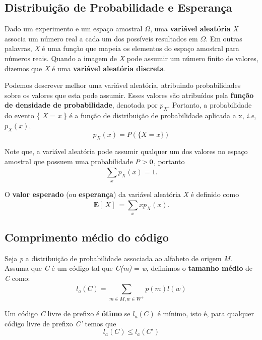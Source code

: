 \subsection{Distribuição de Probabilidade e Esperança}
Dado um experimento e um espaço amostral $\Omega$, uma \textbf{variável aleatória} \emph{X} associa um número real a cada um dos possíveis resultados em $\Omega$. Em outras palavras, \emph{X} é uma função que mapeia os elementos do espaço amostral para números reais. Quando a imagem de \emph{X} pode assumir um número finito de valores, dizemos que \emph{X} é uma \textbf{variável aleatória discreta}.

Podemos descrever melhor uma variável aleatória, atribuindo probabilidades sobre os valores que esta pode assumir. Esses valores são atribuídos pela \textbf{função de densidade de probabilidade}, denotada por \emph{$p_X$}. Portanto, a probabilidade do evento \{ \emph{X} = \emph{x} \} é a função de distribuição de probabilidade aplicada a x, \emph{i.e}, \emph{$p_X(x)$}.
\begin{equation} \label{eq:dist_prob_def}
p_X(x) = P(\{X = x\})
\end{equation}

Note que, a variável aleatória pode assumir qualquer um dos valores no espaço amostral que possuem uma probabilidade $\emph{P} > 0$, portanto
\begin{equation} \label{eq:dist_prob_sum}
\sum_{x}^{}p_X(x) = 1.
\end{equation}

O \textbf{valor esperado} (ou \textbf{esperança}) da variável aleatória \emph{X} é definido como
\begin{equation} \label{eq:exp_val}
\textbf{E}[\ X]\ = \sum_{x}^{} xp_X(x).
\end{equation}

\subsection{Comprimento médio do código}
Seja \emph{p} a distribuição de probabilidade associada ao alfabeto de origem \emph{M}. Assuma que \emph{C} é um código tal que \emph{C(m)} = \emph{w}, definimos o \textbf{tamanho médio} de \emph{C} como:
\begin{equation} \label{eq:code_len}
l_a (C) = \sum_{m \in M, w \in W^+}^{} p(m) l(w)
\end{equation}

Um código \emph{C} livre de prefixo é \textbf{ótimo} se $l_a(C)$ é mínimo, isto é, para qualquer código livre de prefixo \emph{C'} temos que
\begin{equation} \label{eq:code_len_optimal}
l_a(C) \leq l_a(C')
\end{equation}

